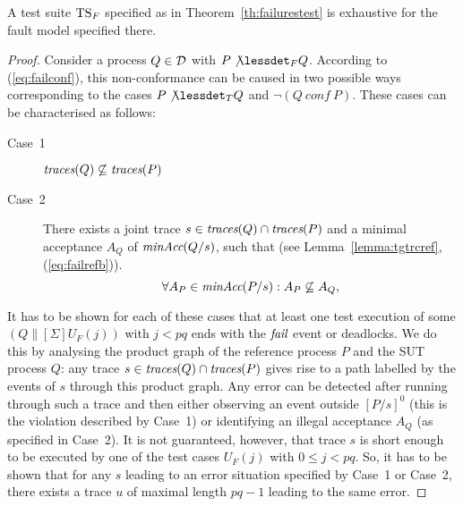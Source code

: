 %
\begin{lemma}\label{lemma:mainfexhaustive}
A test suite ${\text{TS}}_F$ specified as in Theorem~\ref{th:failurestest} is
exhaustive for the fault model specified there.
\end{lemma}
\begin{proof}
Consider a process $Q\in{\cal D}$ with $P\not\lessdet_F Q$. According to
(\ref{eq:failconf}), this non-conformance can be caused in two possible ways
corresponding to the cases $P\not\lessdet_T Q$ and $\neg(Q\ conf\ P)$. These
cases can be characterised as follows:
\begin{description}
\item[Case~1] $\text{\it traces}(Q)\not\subseteq \text{\it traces}(P)$
\item[Case~2] There exists a joint trace $s\in\text{\it traces}(Q)\cap\text{\it traces}(P)$ and a minimal acceptance $A_Q$
of $\text{\it minAcc}(Q/s)$, such that
(see Lemma~\ref{lemma:tgtrcref}, (\ref{eq:failrefb})).
\begin{equation}
\label{eq:accsnotcontained}
\forall A_P\in\text{\it minAcc}(P/s): A_P\not\subseteq A_Q,
\end{equation}
\end{description}
It has to be shown for each of these cases that at least one test execution
of some $(Q\parallel[\Sigma] U_F(j))$ with $j < pq$ ends with the ${\text{\it fail}}$
event or deadlocks. We do this by analysing the product graph of the
reference process $P$ and the SUT process $Q$: any trace
$s\in\text{\it traces}(Q)\cap\text{\it traces}(P)$ gives rise to a path labelled by the events of $s$
through this product graph. Any error can be detected after running through
such a trace and then either observing an event outside $[P/s]^0$ (this is
the violation described by Case~1) or identifying an illegal acceptance $A_Q$
(as specified in Case~2). It is not guaranteed, however, that trace $s$ is
short enough to be executed by one of the test cases $U_F(j)$ with $0\le j <
pq$. So, it has to be shown that for any $s$ leading to an error situation
specified by Case~1 or Case~2, there exists a trace $u$ of maximal length
$pq-1$ leading to the same error.


\end{proof}
